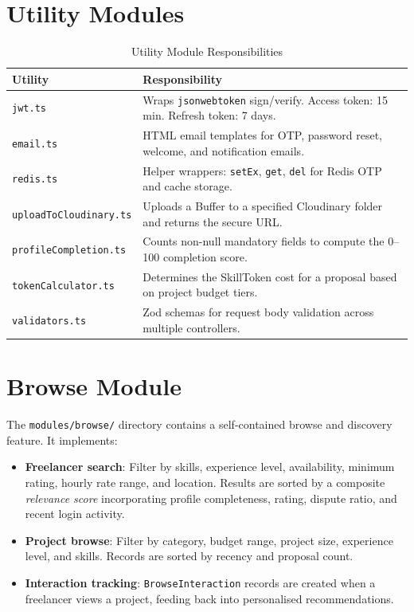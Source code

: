 \section{Utility Modules}

\begin{table}[H]
\centering
\caption{Utility Module Responsibilities}
\begin{tabularx}{\textwidth}{lX}
\toprule
\textbf{Utility} & \textbf{Responsibility} \\
\midrule
\texttt{jwt.ts}               & Wraps \texttt{jsonwebtoken} sign/verify. Access token: 15 min. Refresh token: 7 days. \\
\texttt{email.ts}             & HTML email templates for OTP, password reset, welcome, and notification emails. \\
\texttt{redis.ts}             & Helper wrappers: \texttt{setEx}, \texttt{get}, \texttt{del} for Redis OTP and cache storage. \\
\texttt{uploadToCloudinary.ts} & Uploads a Buffer to a specified Cloudinary folder and returns the secure URL. \\
\texttt{profileCompletion.ts} & Counts non-null mandatory fields to compute the 0--100 completion score. \\
\texttt{tokenCalculator.ts}   & Determines the SkillToken cost for a proposal based on project budget tiers. \\
\texttt{validators.ts}        & Zod schemas for request body validation across multiple controllers. \\
\bottomrule
\end{tabularx}
\end{table}

\section{Browse Module}

The \texttt{modules/browse/} directory contains a self-contained browse and discovery feature. It implements:

\begin{itemize}
  \item \textbf{Freelancer search}: Filter by skills, experience level, availability, minimum rating, hourly rate range, and location. Results are sorted by a composite \textit{relevance score} incorporating profile completeness, rating, dispute ratio, and recent login activity.
  \item \textbf{Project browse}: Filter by category, budget range, project size, experience level, and skills. Records are sorted by recency and proposal count.
  \item \textbf{Interaction tracking}: \texttt{BrowseInteraction} records are created when a freelancer views a project, feeding back into personalised recommendations.
\end{itemize}

